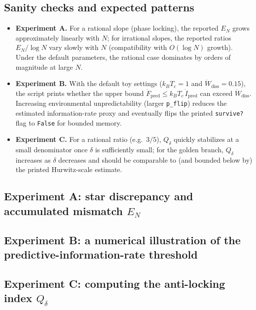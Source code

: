 \subsection{Sanity checks and expected patterns}
\begin{itemize}
  \item \textbf{Experiment A.} For a rational slope (phase locking), the reported $E_N$ grows approximately linearly with $N$; for irrational slopes, the reported ratios $E_N/\log N$ vary slowly with $N$ (compatibility with $O(\log N)$ growth). Under the default parameters, the rational case dominates by orders of magnitude at large $N$.
  \item \textbf{Experiment B.} With the default toy settings ($k_BT_c=1$ and $\dot W_{\mathrm{diss}}=0.15$), the script prints whether the upper bound $\dot F_{\mathrm{pred}}\le k_BT_c\,\dot I_{\mathrm{pred}}$ can exceed $\dot W_{\mathrm{diss}}$. Increasing environmental unpredictability (larger \texttt{p\_flip}) reduces the estimated information-rate proxy and eventually flips the printed \texttt{survive?} flag to \texttt{False} for bounded memory.
  \item \textbf{Experiment C.} For a rational ratio (e.g.\ $3/5$), $Q_\delta$ quickly stabilizes at a small denominator once $\delta$ is sufficiently small; for the golden branch, $Q_\delta$ increases as $\delta$ decreases and should be comparable to (and bounded below by) the printed Hurwitz-scale estimate.
\end{itemize}

\subsection{Experiment A: star discrepancy and accumulated mismatch \texorpdfstring{$E_N$}{EN}}

\subsection{Experiment B: a numerical illustration of the predictive-information-rate threshold}

\subsection{Experiment C: computing the anti-locking index \texorpdfstring{$Q_\delta$}{Qdelta}}


